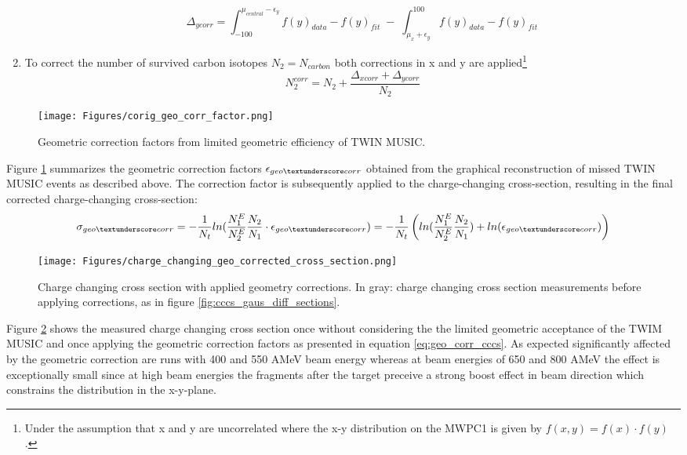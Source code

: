 \begin{enumerate}
\begin{enumerate}
\begin{equation}
\Delta_{ycorr} = \int_{-100}^{\mu_{central} - \epsilon_y} f(y)_{data} - f(y)_{fit} \; - \; \int_{\mu_x + \epsilon_y}^{100} f(y)_{data} - f(y)_{fit} 
\end{equation}
\end{enumerate}
\item To correct the number of survived carbon isotopes $N_2 = N_{carbon}$ both corrections in x and y are applied\footnote{Under the assumption that x and y are uncorrelated where the x-y distribution on the MWPC1 is given by $f(x,y) = f(x)\cdot f(y)$.}
\begin{equation}
N_2^{corr} = N_2 +\frac{\Delta_{xcorr}+\Delta_{ycorr}}{N_2}
\end{equation}
\end{enumerate}
\begin{figure}[htpb]
    \centering
    \texttt{[image: Figures/corig\_geo\_corr\_factor.png]}
    \caption{
    Geometric correction factors from limited geometric efficiency of TWIN MUSIC. 
     }
    \label{fig:geo_corr_twim}
\end{figure}
Figure \ref{fig:geo_corr_twim} summarizes the geometric correction factors $\epsilon_{geo\textunderscore corr}$ obtained from the graphical reconstruction of missed TWIN MUSIC events as described above. The correction factor is subsequently applied to the charge-changing cross-section, resulting in the final corrected charge-changing cross-section:
\begin{equation}
\sigma_{geo\textunderscore corr} = -\frac{1}{N_t} ln(\frac{N_{1}^E}{N_{2}^E}\frac{N_2}{N_1}\cdot \epsilon_{geo\textunderscore corr}) = -\frac{1}{N_t} \left( ln(\frac{N_{1}^E}{N_{2}^E}\frac{N_2}{N_1}) + ln(\epsilon_{geo\textunderscore corr})\right)
\label{eq:geo_corr_cccs}
\end{equation}
\begin{figure}[htpb]
    \centering
    \texttt{[image: Figures/charge\_changing\_geo\_corrected\_cross\_section.png]}
    \caption{
    Charge changing cross section with applied geometry corrections. In gray: charge changing cross section measurements before applying corrections, as in figure \ref{fig:cccs_gaus_diff_sections}. 
     }
    \label{fig:geo_corr_cross_sec}
\end{figure}
Figure \ref{fig:geo_corr_cross_sec} shows the measured charge changing cross section once without considering the the limited geometric acceptance of the TWIM MUSIC and once applying the geometric correction factors as presented in equation \ref{eq:geo_corr_cccs}. As expected significantly affected by the  geometric correction are runs with 400 and 550 AMeV beam energy whereas at beam energies of 650 and 800 AMeV the effect is exceptionally small since at high beam energies  the fragments after the target preceive a strong boost effect in beam direction which constrains the distribution in the x-y-plane.

